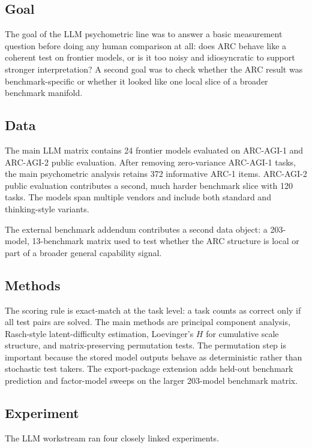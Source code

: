 \documentclass[11pt,letterpaper]{article}
\begin{document}
\subsection{Goal}

The goal of the LLM psychometric line was to answer a basic measurement question before doing any human comparison at all: does ARC behave like a coherent test on frontier models, or is it too noisy and idiosyncratic to support stronger interpretation? A second goal was to check whether the ARC result was benchmark-specific or whether it looked like one local slice of a broader benchmark manifold.

\subsection{Data}

The main LLM matrix contains 24 frontier models evaluated on ARC-AGI-1 and ARC-AGI-2 public evaluation. After removing zero-variance ARC-AGI-1 tasks, the main psychometric analysis retains 372 informative ARC-1 items. ARC-AGI-2 public evaluation contributes a second, much harder benchmark slice with 120 tasks. The models span multiple vendors and include both standard and thinking-style variants.

The external benchmark addendum contributes a second data object: a 203-model, 13-benchmark matrix used to test whether the ARC structure is local or part of a broader general capability signal.

\subsection{Methods}

The scoring rule is exact-match at the task level: a task counts as correct only if all test pairs are solved. The main methods are principal component analysis, Rasch-style latent-difficulty estimation, Loevinger's $H$ for cumulative scale structure, and matrix-preserving permutation tests. The permutation step is important because the stored model outputs behave as deterministic rather than stochastic test takers. The export-package extension adds held-out benchmark prediction and factor-model sweeps on the larger 203-model benchmark matrix.

\subsection{Experiment}

The LLM workstream ran four closely linked experiments.
\end{document}
